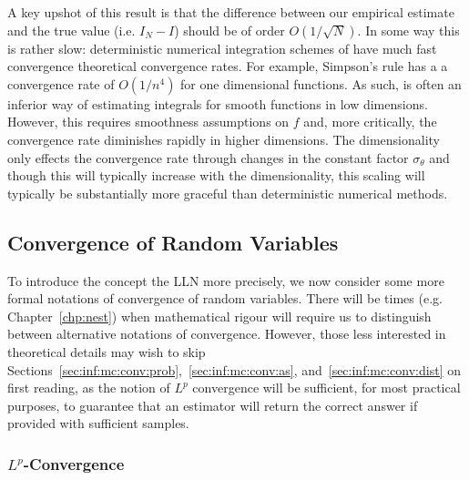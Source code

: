 A key upshot of this result is that the difference between our empirical estimate and the true value (i.e. $I_N-I$)
 should be of order $O(1/\sqrt{N})$.  In some way this is rather slow: deterministic numerical
integration schemes of have much fast convergence theoretical convergence rates.  For example,
Simpson's rule has a a convergence rate of $O(1/n^4)$ for one dimensional functions.  
As such, \mc is often an inferior way of estimating integrals for smooth functions
in low dimensions.  However, this
requires smoothness assumptions on $f$ and, more critically, the convergence rate diminishes rapidly
in higher dimensions.   
The dimensionality only effects the \mc convergence rate through changes in the constant factor $\sigma_{\theta}$
and though this will typically increase with the dimensionality, this 
scaling will typically be substantially more graceful than deterministic numerical methods.

\subsection{Convergence of Random Variables}
\label{sec:inf:mc:conv}

To introduce the concept the LLN more precisely, we now consider some more formal notations
of convergence of random variables.  There will be times (e.g. Chapter~\ref{chp:nest})
when mathematical rigour will require us to distinguish between alternative notations of convergence.
However, those less interested in theoretical details may wish to
skip Sections~\ref{sec:inf:mc:conv:prob},~\ref{sec:inf:mc:conv:as}, and~\ref{sec:inf:mc:conv:dist}
on first reading, as the notion of $L^p$ convergence will be sufficient, for most practical purposes,
to guarantee that an estimator will return the correct answer if provided 
with sufficient samples. 

\subsubsection{$L^p$-Convergence}
\label{sec:inf:mc:conv:Lr}

